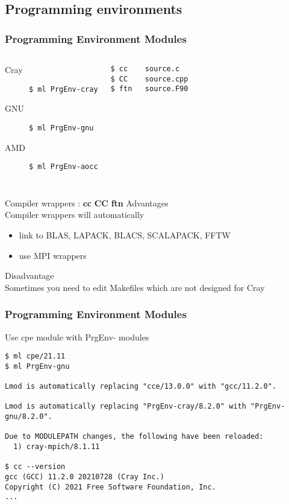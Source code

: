 \subsection{Programming environments}
\begin{frame}[fragile]
  \frametitle{Programming Environment Modules}

\begin{columns}[t]
  \begin{description}
  \item [Cray] \verb|$ ml PrgEnv-cray|
  \item [GNU] \verb|$ ml PrgEnv-gnu|
  \item [AMD] \verb|$ ml PrgEnv-aocc|
  \end{description}
    \begin{verbatim}
$ cc	source.c
$ CC	source.cpp
$ ftn	source.F90
  \end{verbatim}
\end{columns}
  \begin{exampleblock}{Compiler wrappers : \alert{\textbf{cc} \textbf{CC} \textbf{ftn}}}
    \alert{Advantages}\\
    Compiler wrappers will automatically 
    \begin{itemize}
      \item link to BLAS, LAPACK, BLACS, SCALAPACK, FFTW\\
      \item use MPI wrappers\\
    \end{itemize}
    \alert{Disadvantage}\\
    Sometimes you need to edit Makefiles which are not designed for Cray 
\end{exampleblock}
\end{frame}


\begin{frame}[fragile]
\frametitle{Programming Environment Modules}
    \begin{exampleblock}{
        Use cpe module with PrgEnv- modules
    }
    \begin{verbatim}
$ ml cpe/21.11
$ ml PrgEnv-gnu

Lmod is automatically replacing "cce/13.0.0" with "gcc/11.2.0".

Lmod is automatically replacing "PrgEnv-cray/8.2.0" with "PrgEnv-gnu/8.2.0".

Due to MODULEPATH changes, the following have been reloaded:
  1) cray-mpich/8.1.11

$ cc --version
gcc (GCC) 11.2.0 20210728 (Cray Inc.)
Copyright (C) 2021 Free Software Foundation, Inc.
...
    \end{verbatim}
    \end{exampleblock}
\end{frame}


